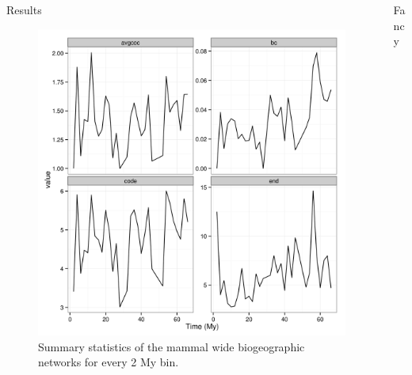 \documentclass[final]{beamer}\usepackage[]{graphicx}\usepackage[]{color}
\newlength{\onecolwid}
\newlength{\twocolwid}
\begin{document}
\begin{frame}[t]
\begin{columns}
    \begin{column}{\twocolwid}
      \begin{columns}[t,totalwidth = \twocolwid]
        \begin{column}{\onecolwid}
          \begin{block}{Results}
            \begin{figure}[ht]
              \begin{center}
                \includegraphics{figure/gen_bin}
              \end{center}
              \caption{Summary statistics of the mammal wide biogeographic networks for every 2 My bin.}
              \label{fig:net_gen}
            \end{figure}

          \end{block}
        \end{column}

        \begin{column}{\onecolwid}
          \begin{block}{Fancy}
          \end{block}
        \end{column}
      \end{columns}


\end{column}
\end{columns}
\end{frame}
\end{document}
